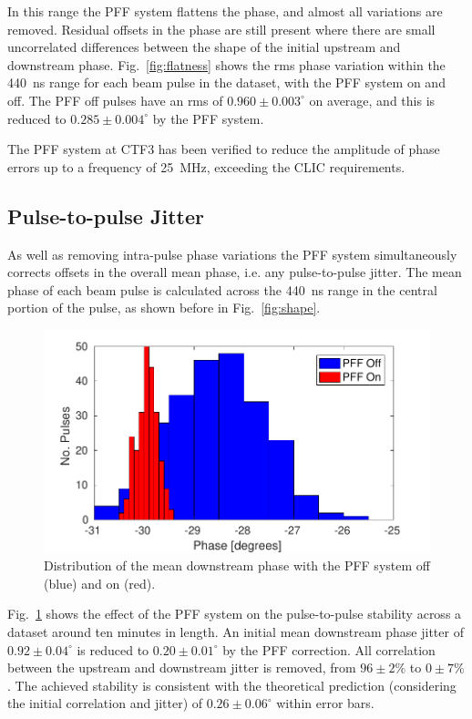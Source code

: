 \documentclass[%
 reprint,
superscriptaddress,
 amsmath,amssymb,
 prl,
]{revtex4-1}
\begin{document}
In this range the PFF system flattens the phase, 
and almost all variations are removed. Residual offsets in the phase are still 
present where there are small uncorrelated differences between the shape of the 
initial upstream and downstream phase. Fig.~\ref{fig:flatness} shows the rms 
phase variation within the 440~ns range 
for each beam pulse in the dataset, with the PFF system on and off. The PFF off 
pulses have an rms of \(0.960\pm0.003^\circ\) on average, and this is reduced 
to \(0.285\pm0.004^\circ\) by the PFF system.

The PFF system at CTF3 has been verified to reduce the amplitude of 
phase errors up to a frequency of 25~MHz, exceeding the CLIC requirements.



\subsection{\label{ss:meanJit}Pulse-to-pulse Jitter}

As well as removing intra-pulse phase variations the PFF system simultaneously 
corrects offsets in the overall mean phase, i.e. any pulse-to-pulse jitter. The 
mean phase of each beam pulse is calculated across the 440~ns range in the 
central portion of the pulse, as shown before in Fig.~\ref{fig:shape}.

\begin{figure}
	\includegraphics[width=\columnwidth]{figs/meanJit}%
	\caption{\label{fig:meanJit}Distribution of the mean downstream phase with 
		the 
		PFF system off (blue) and on (red).}
\end{figure}

Fig.~\ref{fig:meanJit} shows the effect of the PFF system on the pulse-to-pulse 
stability across a dataset around ten minutes in length. An 
initial mean downstream phase jitter of \(0.92\pm0.04^\circ\) is reduced to \(0.20\pm0.01^\circ\) by the PFF 
correction. All correlation between the upstream and downstream jitter is removed, from 
\(96\pm2\%\) to \(0\pm7\%\). The achieved stability is consistent with the theoretical prediction (considering the initial correlation and jitter) of \(0.26\pm0.06^\circ\) within error bars.
\end{document}
